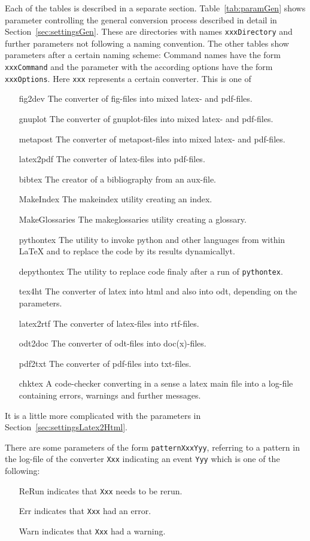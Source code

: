 Each of the tables is described in a separate section. 
Table~\ref{tab:paramGen} 
shows parameter controlling the general conversion process 
described in detail in Section~\ref{sec:settingsGen}. 
These are directories with names \texttt{xxxDirectory} 
and further parameters not following a naming convention. 
The other tables show parameters after a certain naming scheme: 
Command names have the form \texttt{xxxCommand} 
and the parameter with the according options have the form \texttt{xxxOptions}. 
Here \texttt{xxx} represents a certain converter. 
This is one of 
%
\begin{itemize}
\item[fig2dev]
The converter of fig-files into mixed latex- and pdf-files. 
\item[gnuplot]
The converter of gnuplot-files into mixed latex- and pdf-files. 
\item[metapost]
The converter of metapost-files into mixed latex- and pdf-files.
\item[latex2pdf]
The converter of latex-files into pdf-files. 
\item[bibtex]
The creator of a bibliography from an aux-file.
\item[MakeIndex]
The makeindex utility creating an index. 
\item[MakeGlossaries]
The makeglossaries utility creating a glossary. 
\item[pythontex]
The utility to invoke python and other languages from within \LaTeX{} 
and to replace the code by its results dynamicallyt. 
\item[depythontex]
The utility to replace code finaly after a run of \texttt{pythontex}. 
\item[tex4ht]
The converter of latex into html and also into odt, 
depending on the parameters. 
\item[latex2rtf]
The converter of latex-files into rtf-files. 
\item[odt2doc]
The converter of odt-files into doc(x)-files. %
\item[pdf2txt]
The converter of pdf-files into txt-files. 
\item[chktex]
A code-checker converting in a sense a latex main file into a log-file 
containing errors, warnings and further messages. 
\end{itemize}

It is a little more complicated 
with the parameters in Section~\ref{sec:settingsLatex2Html}. 

There are some parameters of the form \texttt{patternXxxYyy}, 
referring to a pattern in the log-file of the converter \texttt{Xxx} 
indicating an event \texttt{Yyy} which is one of the following: 
%
\begin{itemize}
\item[ReRun]
indicates that \texttt{Xxx} needs to be rerun.
\item[Err]
indicates that \texttt{Xxx} had an error. 
\item[Warn]
indicates that \texttt{Xxx} had a warning. 
\end{itemize}

